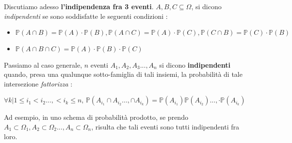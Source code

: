 \documentclass[12pt, letterpaper]{article}
\begin{document}
\\\hphantom{.}\\
Discutiamo adesso \textbf{l'indipendenza fra 3 eventi}. \(A,B,C\subseteq\Omega\), si dicono \textit{indipendenti} se
sono soddisfatte le seguenti condizioni :\begin{itemize}
    \item \( \mathbb{P}(A\cap B)=\mathbb{P}(A)\cdot\mathbb{P}(B),\mathbb{P}(A\cap C)=\mathbb{P}(A)\cdot\mathbb{P}(C),\mathbb{P}(C\cap B)=\mathbb{P}(C)\cdot\mathbb{P}(B) \)
    \item \(\mathbb{P}(A\cap B\cap C)=\mathbb{P}(A)\cdot\mathbb{P}(B)\cdot\mathbb{P}(C)\)
\end{itemize}
Passiamo al caso generale, \(n\) eventi \(A_1,A_2,A_3...,A_n\) si dicono \textbf{indipendenti} quando, presa 
una qualunque sotto-famiglia di tali insiemi, la probabilità di tale intersezione \textit{fattorizza} :
\begin{center}
    \(
    \forall k| 1\le i_1 <i_2...,<i_k\le n \), \(
    \mathbb{P}(A_{i_1}\cap A_{i_2}...,\cap A_{i_k})=\mathbb{P}(A_{i_1})\mathbb{P}(A_{i_2})...,\cdot \mathbb{P}(A_{i_k})    \)
    
\end{center}
Ad esempio, in uno schema di probabilità prodotto, se prendo \(A_1\subset\Omega_1,A_2\subset\Omega_2...,A_n\subset\Omega_n\), 
risulta che tali eventi sono tutti indipendenti fra loro.
\end{document}

